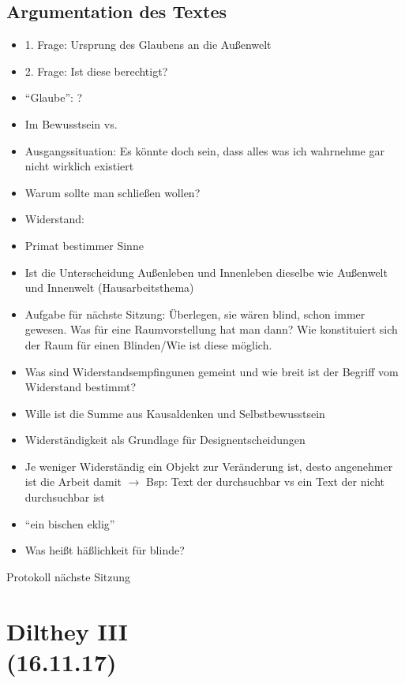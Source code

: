 \documentclass[emulatestandardclasses]{scrartcl}
\begin{document}
\subsection{Argumentation des Textes}

\begin{itemize}
  \item 1. Frage: Ursprung des Glaubens an die Außenwelt
  \item 2. Frage: Ist diese berechtigt?
  \item "`Glaube"': ?
  \item Im Bewusstsein vs. 
  \item Ausgangssituation: Es könnte doch sein, dass alles was ich wahrnehme gar nicht wirklich existiert
  \item Warum sollte man schließen wollen?
  \item Widerstand: 
  \item Primat bestimmer Sinne
  \item Ist die Unterscheidung Außenleben und Innenleben dieselbe wie Außenwelt und Innenwelt (Hausarbeitsthema)
  \item Aufgabe für nächste Sitzung: Überlegen, sie wären blind, schon immer gewesen. Was für eine Raumvorstellung hat man dann? Wie konstituiert sich der Raum für einen Blinden/Wie ist diese möglich.
  \item Was sind Widerstandsempfingunen gemeint und wie breit ist der Begriff vom Widerstand bestimmt?
\end{itemize}


\begin{itemize}
  \item Wille ist die Summe aus Kausaldenken und Selbstbewusstsein
  \item Widerständigkeit als Grundlage für Designentscheidungen
  \item Je weniger Widerständig ein Objekt zur Veränderung ist, desto angenehmer ist die Arbeit   damit $\rightarrow$ Bsp: Text der durchsuchbar vs ein Text der nicht durchsuchbar ist
  \item "`ein bischen eklig"'
  \item Was heißt häßlichkeit für blinde?
\end{itemize}

Protokoll nächste Sitzung


\section{Dilthey III \\(16.11.17)}
\end{document}
